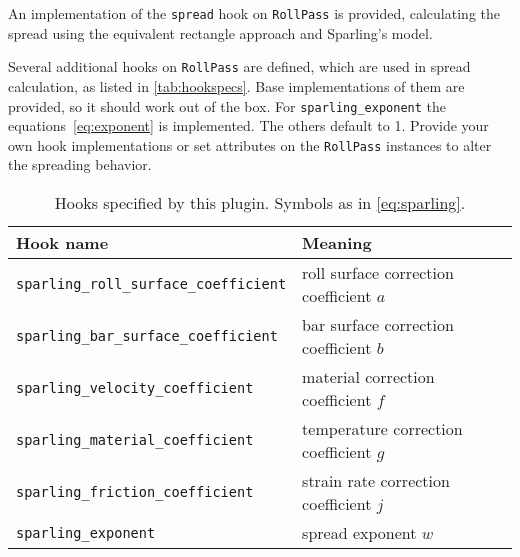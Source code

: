 \documentclass[11pt]{PyRollDocs}
\begin{document}
    An implementation of the \lstinline{spread} hook on \lstinline{RollPass} is provided,
    calculating the spread using the equivalent rectangle approach and Sparling's model.

    Several additional hooks on \lstinline{RollPass} are defined, which are used in spread calculation, as listed in \autoref{tab:hookspecs}.
    Base implementations of them are provided, so it should work out of the box.
    For \lstinline{sparling_exponent} the equations~\ref{eq:exponent} is implemented.
    The others default to \num{1}.
    Provide your own hook implementations or set attributes on the \lstinline{RollPass} instances to alter the spreading behavior.

    \begin{table}
        \centering
        \caption{Hooks specified by this plugin. Symbols as in \autoref{eq:sparling}.}
        \label{tab:hookspecs}
        \begin{tabular}{ll}
            \toprule
            Hook name                                     & Meaning                                 \\
            \midrule
            \texttt{sparling\_roll\_surface\_coefficient} & roll surface correction coefficient $a$ \\
            \texttt{sparling\_bar\_surface\_coefficient}  & bar surface correction coefficient $b$  \\
            \texttt{sparling\_velocity\_coefficient}      & material correction coefficient $f$     \\
            \texttt{sparling\_material\_coefficient}      & temperature correction coefficient $g$  \\
            \texttt{sparling\_friction\_coefficient}      & strain rate correction coefficient $j$  \\
            \texttt{sparling\_exponent}                   & spread exponent $w$                     \\
            \bottomrule
        \end{tabular}
    \end{table}

    \printbibliography
\end{document}
